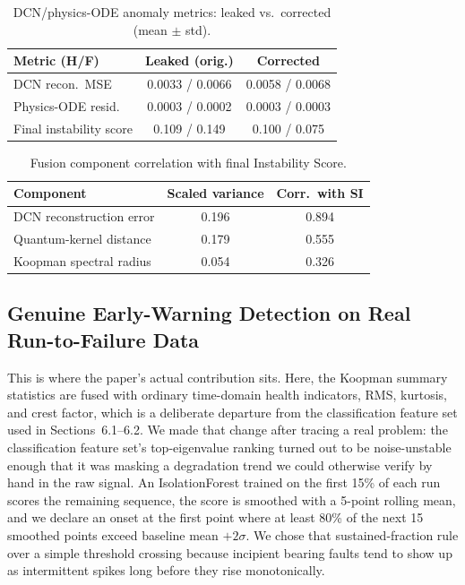 \documentclass[3p,times,procedia]{elsarticle}
\begin{document}
\begin{table}[ht]
\caption{DCN/physics-ODE anomaly metrics: leaked vs.\ corrected (mean $\pm$ std).}
\label{tab:leakage}
\centering
\begin{tabular}{lcc}
\toprule
\textbf{Metric (H/F)} & \textbf{Leaked (orig.)} & \textbf{Corrected} \\
\midrule
DCN recon.\ MSE & 0.0033 / 0.0066 & 0.0058 / 0.0068 \\
Physics-ODE resid. & 0.0003 / 0.0002 & 0.0003 / 0.0003 \\
Final instability score & 0.109 / 0.149 & 0.100 / 0.075 \\
\bottomrule
\end{tabular}
\end{table}

\begin{table}[ht]
\caption{Fusion component correlation with final Instability Score.}
\label{tab:correlation}
\centering
\begin{tabular}{lcc}
\toprule
\textbf{Component} & \textbf{Scaled variance} & \textbf{Corr.\ with SI} \\
\midrule
DCN reconstruction error & 0.196 & 0.894 \\
Quantum-kernel distance & 0.179 & 0.555 \\
Koopman spectral radius & 0.054 & 0.326 \\
\bottomrule
\end{tabular}
\end{table}

\subsection{Genuine Early-Warning Detection on Real Run-to-Failure Data}

This is where the paper's actual contribution sits. Here, the Koopman summary statistics are fused with ordinary time-domain health indicators, RMS, kurtosis, and crest factor, which is a deliberate departure from the classification feature set used in Sections~6.1--6.2. We made that change after tracing a real problem: the classification feature set's top-eigenvalue ranking turned out to be noise-unstable enough that it was masking a degradation trend we could otherwise verify by hand in the raw signal. An IsolationForest trained on the first 15\% of each run scores the remaining sequence, the score is smoothed with a 5-point rolling mean, and we declare an onset at the first point where at least 80\% of the next 15 smoothed points exceed baseline mean $+ 2\sigma$. We chose that sustained-fraction rule over a simple threshold crossing because incipient bearing faults tend to show up as intermittent spikes long before they rise monotonically.
\end{document}
